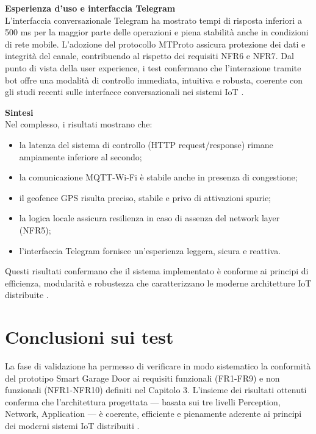 \textbf{Esperienza d'uso e interfaccia Telegram} \\
L'interfaccia conversazionale Telegram ha mostrato tempi di risposta inferiori a 500 ms per la maggior parte delle operazioni e piena stabilità anche in condizioni di rete mobile. L'adozione del protocollo MTProto assicura protezione dei dati e integrità del canale, contribuendo al rispetto dei requisiti NFR6 e NFR7.
Dal punto di vista della user experience, i test confermano che l'interazione tramite bot offre una modalità di controllo immediata, intuitiva e robusta, coerente con gli studi recenti sulle interfacce conversazionali nei sistemi IoT \cite{Schiavone2021, Yoon2020}.

\textbf{Sintesi} \\
Nel complesso, i risultati mostrano che:
\begin{itemize}
    \item la latenza del sistema di controllo (HTTP request/response) rimane ampiamente inferiore al secondo;
    \item la comunicazione MQTT-Wi-Fi è stabile anche in presenza di congestione;
    \item il geofence GPS risulta preciso, stabile e privo di attivazioni spurie;
    \item la logica locale assicura resilienza in caso di assenza del network layer (NFR5);
    \item l'interfaccia Telegram fornisce un'esperienza leggera, sicura e reattiva.
\end{itemize}
Questi risultati confermano che il sistema implementato è conforme ai principi di efficienza, modularità e robustezza che caratterizzano le moderne architetture IoT distribuite \cite{Gubbi2013, Tang2022}.

\section{Conclusioni sui test}
La fase di validazione ha permesso di verificare in modo sistematico la conformità del prototipo Smart Garage Door ai requisiti funzionali (FR1-FR9) e non funzionali (NFR1-NFR10) definiti nel Capitolo 3. L'insieme dei risultati ottenuti conferma che l'architettura progettata — basata sui tre livelli Perception, Network, Application — è coerente, efficiente e pienamente aderente ai principi dei moderni sistemi IoT distribuiti \cite{Gubbi2013, Zanella2014, Tang2022}.

